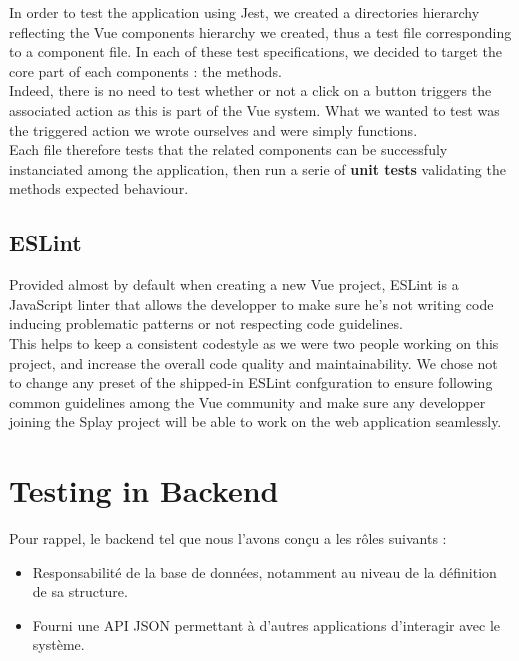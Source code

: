 \documentclass{eplmastersthesis}
\begin{document}
        In order to test the application using Jest, we created a directories
        hierarchy reflecting the Vue components hierarchy we created, thus
        a test file corresponding to a component file. In each of these
        test specifications, we decided to target the core part of each
        components : the methods.\\
        Indeed, there is no need to test whether or not a click on a button
        triggers the associated action as this is part of the Vue system. What
        we wanted to test was the triggered action we wrote ourselves and
        were simply functions.\\
        Each file therefore tests that the related components can be
        successfuly instanciated among the application, then run a serie
        of \textbf{unit tests} validating the methods expected behaviour.

      \subsection{ESLint}

        Provided almost by default when creating a new Vue project, ESLint
        \cite{eslint} is a JavaScript linter that allows the developper to
        make sure he's not writing code inducing problematic patterns or not
        respecting code guidelines.\\
        This helps to keep a consistent codestyle as we were two people working
        on this project, and increase the overall code quality and
        maintainability. We chose not to change any preset of the shipped-in
        ESLint confguration to ensure following common guidelines among the Vue
        community and make sure any developper joining the Splay project will
        be able to work on the web application seamlessly.


    \section{Testing in Backend}

      Pour rappel, le backend tel que nous l'avons conçu a les rôles suivants :
      \begin{itemize}
        \item Responsabilité de la base de données, notamment au niveau de
        la définition de sa structure.
        \item Fourni une API JSON permettant à d'autres applications d'interagir
        avec le système.
      \end{itemize}
\end{document}
